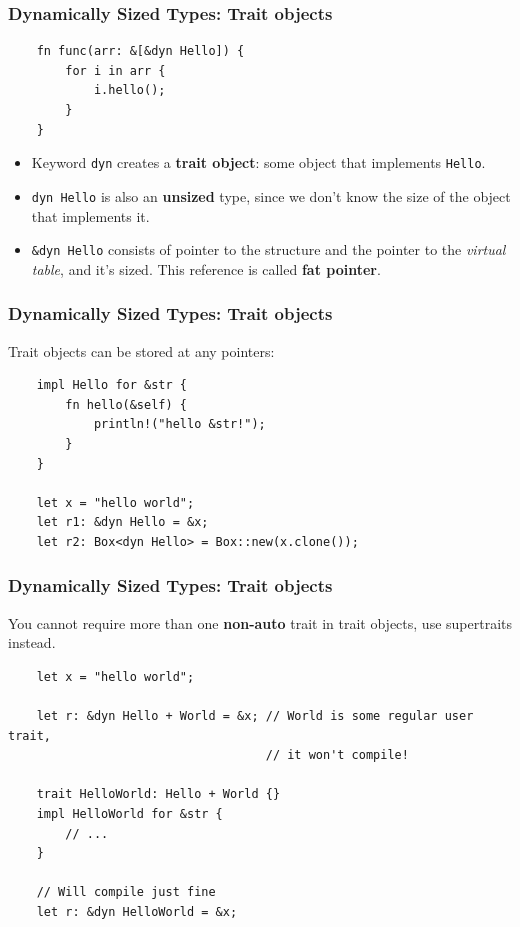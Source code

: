\documentclass[aspectratio=1610,t]{beamer}
\begin{document}

\begin{frame}[fragile]
\frametitle{Dynamically Sized Types: Trait objects}
\begin{verbatim}
    fn func(arr: &[&dyn Hello]) {
        for i in arr {
            i.hello();
        }
    }
\end{verbatim}

\begin{itemize}[leftmargin=0pt]
    \item<2-> Keyword \texttt{dyn} creates a \textbf{trait object}: some object that implements \texttt{Hello}.
    \item<3-> \texttt{dyn Hello} is also an \textbf{unsized} type, since we don't know the size of the object that implements it.
    \item<4-> \texttt{\&dyn Hello} consists of pointer to the structure and the pointer to the \textit{virtual table}, and it's sized. This reference is called \textbf{fat pointer}.
\end{itemize}
\end{frame}


\begin{frame}[fragile]
\frametitle{Dynamically Sized Types: Trait objects}
Trait objects can be stored at any pointers:

\begin{verbatim}
    impl Hello for &str {
        fn hello(&self) {
            println!("hello &str!");
        }
    }

    let x = "hello world";
    let r1: &dyn Hello = &x;
    let r2: Box<dyn Hello> = Box::new(x.clone());
\end{verbatim}
\end{frame}


\begin{frame}[fragile]
\frametitle{Dynamically Sized Types: Trait objects}
You cannot require more than one \textbf{non-auto} trait in trait objects, use supertraits instead.

\begin{verbatim}
    let x = "hello world";

    let r: &dyn Hello + World = &x; // World is some regular user trait,
                                    // it won't compile!
    
    trait HelloWorld: Hello + World {}
    impl HelloWorld for &str {
        // ...
    }

    // Will compile just fine
    let r: &dyn HelloWorld = &x;
\end{verbatim}
\end{frame}
\end{document}
